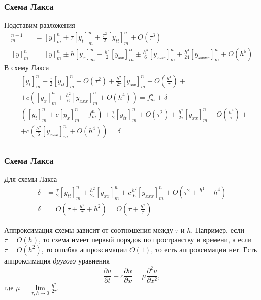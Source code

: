\documentclass[professionalfonts,compress,unicode,aspectratio=169]{beamer}
\begin{document}
\begin{frame}\frametitle{Схема Лакса}
	Подставим разложения
	\vspace{-1ex}
	\begin{align*}
	[y]^{n+1}_m &= [y]^n_m + \tau [y_t]_m^n + \frac{\tau^2}{2} [y_{tt}]_m^n + O(\tau^3)\\
	[y]^n_{m} &= [y]^n_m \pm h[y_x]_m^n + \frac{h^2}{2} [y_{xx}]_m^n \pm \frac{h^3}{6} [y_{xxx}]_m^n + \frac{h^4}{24} [y_{xxxx}]_m^n + O(h^5)
	\end{align*}
	В схему Лакса
	\vspace{-1ex}
	\begin{align*}
	&[y_t]_m^n + \frac{\tau}{2} [y_{tt}]_m^n + O(\tau^2) + \frac{h^2}{2\tau}[y_{xx}]_m^n + O\left(\frac{h^4}{\tau}\right) + \\
	&+c\left([y_x]_m^n + \frac{h^2}{6} [y_{xxx}]_m^n + O(h^4)\right) = f^n_m + \delta\\
	&([y_t]_m^n+c[y_x]_m^n-f_m^n) + \frac{\tau}{2} [y_{tt}]_m^n + O(\tau^2) + \frac{h^2}{2\tau}[y_{xx}]_m^n + O\left(\frac{h^4}{\tau}\right) +\\
	&+c\left(\frac{h^2}{6} [y_{xxx}]_m^n + O(h^4)\right) = \delta\\
	\end{align*}
\end{frame}

\begin{frame}\frametitle{Схема Лакса}
	Для схемы Лакса
	\begin{align*}
	\delta &= \frac{\tau}{2} [y_{tt}]_m^n + \frac{h^2}{2\tau}[y_{xx}]_m^n + c\frac{h^2}{6} [y_{xxx}]_m^n +  O\left(\tau^2 + \frac{h^4}{\tau} + h^4\right) \\
	\delta &= O\left(\tau + \frac{h^2}{\tau} + h^2\right) = O\left(\tau + \frac{h^2}{\tau}\right)
	\end{align*}
	
	Аппроксимация схемы зависит от соотношения между $\tau$ и $h$. Например, если $\tau = O(h)$, то схема имеет первый порядок по пространству и времени,
	а если $\tau = O(h^2)$, то ошибка аппроксимации $O(1)$, то есть аппроксимации нет. Есть аппроксимация \emph{другого} уравнения
	\[
		\frac{\partial u}{\partial t} + c\frac{\partial u}{\partial x} =
\mu\frac{\partial^2 u}{\partial x^2},
	\]
	где $\mu = \lim\limits_{\tau,h \to 0} \frac{h^2}{2\tau}$.
\end{frame}
\end{document}
